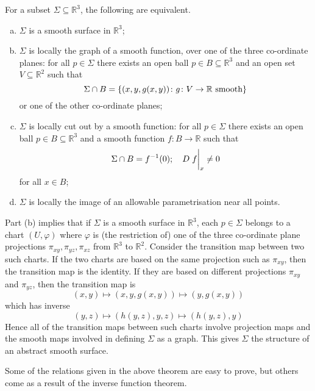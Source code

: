 \begin{theorem}
	For a subset \( \Sigma \subseteq \mathbb R^3 \), the following are equivalent.
	\begin{enumerate}[(a)]
		\item \( \Sigma \) is a smooth surface in \( \mathbb R^3 \);
		\item \( \Sigma \) is locally the graph of a smooth function, over one of the three co-ordinate planes: for all \( p \in \Sigma \) there exists an open ball \( p \in B \subseteq \mathbb R^3 \) and an open set \( V \subseteq \mathbb R^2 \) such that
			\[ \Sigma \cap B = \qty{(x, y, g(x,y)) \colon g \colon V \to \mathbb R \text{ smooth}} \]
			or one of the other co-ordinate planes;
		\item \( \Sigma \) is locally cut out by a smooth function: for all \( p \in \Sigma \) there exists an open ball \( p \in B \subseteq \mathbb R^3 \) and a smooth function \( f \colon B \to \mathbb R \) such that
			\[ \Sigma \cap B = f^{-1}(0);\quad D \eval{f}_x \neq 0 \]
			for all \( x \in B \);
		\item \( \Sigma \) is locally the image of an allowable parametrisation near all points.
	\end{enumerate}
\end{theorem}
\begin{remark}
	Part (b) implies that if \( \Sigma \) is a smooth surface in \( \mathbb R^3 \), each \( p \in \Sigma \) belongs to a chart \( (U, \varphi) \) where \( \varphi \) is (the restriction of) one of the three co-ordinate plane projections \( \pi_{xy}, \pi_{yz}, \pi_{xz} \) from \( \mathbb R^3 \) to \( \mathbb R^2 \).
	Consider the transition map between two such charts.
	If the two charts are based on the same projection such as \( \pi_{xy} \), then the transition map is the identity.
	If they are based on different projections \( \pi_{xy} \) and \( \pi_{yz} \), then the transition map is
	\[ (x,y) \mapsto (x,y,g(x,y)) \mapsto (y,g(x,y)) \]
	which has inverse
	\[ (y,z) \mapsto (h(y,z),y,z) \mapsto (h(y,z),y) \]
	Hence all of the transition maps between such charts involve projection maps and the smooth maps involved in defining \( \Sigma \) as a graph.
	This gives \( \Sigma \) the structure of an abstract smooth surface.
\end{remark}
Some of the relations given in the above theorem are easy to prove, but others come as a result of the inverse function theorem.

